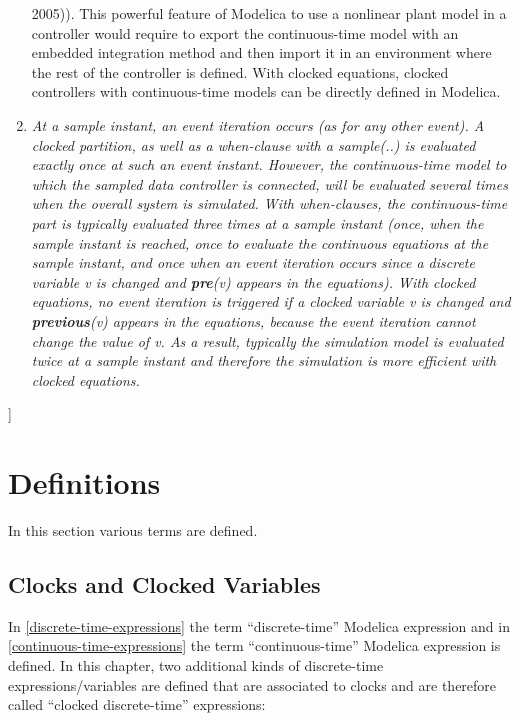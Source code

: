 \documentclass[10pt,a4paper]{report}
\def\doublelabel#1{\label{#1}\hypertarget{#1}{}}
\begin{document}
\begin{enumerate}
{  2005)). This powerful feature of Modelica to use a nonlinear plant
  model in a controller would require to export the continuous-time
  model with an embedded integration method and then import it in an
  environment where the rest of the controller is defined. With clocked
  equations, clocked controllers with continuous-time models can be
  directly defined in Modelica.}
\item
  \emph{At a sample instant, an event iteration occurs (as for any other
  event). A clocked partition, as well as a when-clause with a
  sample(..) is evaluated exactly once at such an event instant.
  However, the continuous-time model to which the sampled data
  controller is connected, will be evaluated several times when the
  overall system is simulated. With when-clauses, the continuous-time
  part is typically evaluated three times at a sample instant (once,
  when the sample instant is reached, once to evaluate the continuous
  equations at the sample instant, and once when an event iteration
  occurs since a discrete variable v is changed and \textbf{pre}(v)
  appears in the equations). With clocked equations, no event iteration
  is triggered if a clocked variable v is changed and
  \textbf{previous}(v) appears in the equations, because the event
  iteration cannot change the value of v. As a result, typically the
  simulation model is evaluated twice at a sample instant and therefore
  the simulation is more efficient with clocked equations.}
\end{enumerate}

{]}

\section{Definitions}\doublelabel{definitions}

In this section various terms are defined.

\subsection{Clocks and Clocked Variables}\doublelabel{clocks-and-clocked-variables}

In \ref{discrete-time-expressions} the term ``discrete-time'' Modelica expression and in
\ref{continuous-time-expressions} the term ``continuous-time'' Modelica expression is
defined. In this chapter, two additional kinds of discrete-time
expressions/variables are defined that are associated to clocks and are
therefore called ``clocked discrete-time'' expressions:
\end{document}
